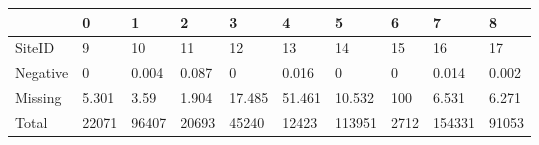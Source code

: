 \begin{tabular}{llllllllll}
\toprule
{} &      0 &      1 &      2 &       3 &       4 &       5 &     6 &       7 &      8 \\
\midrule
SiteID   &      9 &     10 &     11 &      12 &      13 &      14 &    15 &      16 &     17 \\
Negative &      0 &  0.004 &  0.087 &       0 &   0.016 &       0 &     0 &   0.014 &  0.002 \\
Missing  &  5.301 &   3.59 &  1.904 &  17.485 &  51.461 &  10.532 &   100 &   6.531 &  6.271 \\
Total    &  22071 &  96407 &  20693 &   45240 &   12423 &  113951 &  2712 &  154331 &  91053 \\
\bottomrule
\end{tabular}
